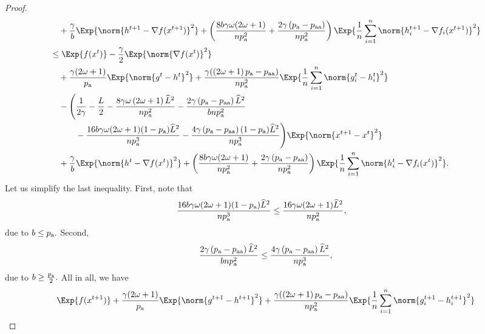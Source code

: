 \documentclass{article}
\newcommand*{\probavailable}{\ensuremath{p_{\textnormal{a}}}}
\newcommand*{\probpairaa}{\ensuremath{p_{\textnormal{aa}}}}
\begin{document}
\begin{proof}
\begin{align*}
      &\quad  + \frac{\gamma}{b} \Exp{\norm{h^{t+1} - \nabla f(x^{t+1})}^2} + \left(\frac{8 b \gamma \omega (2 \omega + 1)}{n \probavailable^2} + \frac{2 \gamma \left(\probavailable - \probpairaa\right)}{n \probavailable^2}\right) \Exp{\frac{1}{n}\sum_{i=1}^n\norm{h^{t+1}_i - \nabla f_i(x^{t+1})}^2}\\
      &\leq \Exp{f(x^t)} - \frac{\gamma}{2}\Exp{\norm{\nabla f(x^t)}^2} \\
      &\quad + \frac{\gamma (2 \omega + 1)}{\probavailable} \Exp{\norm{g^{t} - h^{t}}^2} + \frac{\gamma (\left(2 \omega + 1\right)\probavailable - \probpairaa)}{n \probavailable^2} \Exp{\frac{1}{n}\sum_{i=1}^n\norm{g^{t}_i - h^{t}_i}^2} \\
      &\quad - \Bigg(\frac{1}{2\gamma} - \frac{L}{2} - \frac{8 \gamma \omega \left(2 \omega + 1\right) \widehat{L}^2}{n \probavailable^2} - \frac{2\gamma \left(\probavailable - \probpairaa\right)\widehat{L}^2}{b n \probavailable^2} \\
      &\quad\qquad - \frac{16 b \gamma \omega (2 \omega + 1) (1 - \probavailable) \widehat{L}^2}{n \probavailable^3} - \frac{4 \gamma \left(\probavailable - \probpairaa\right) (1 - \probavailable) \widehat{L}^2}{n \probavailable^3} \Bigg) \Exp{\norm{x^{t+1} - x^t}^2} \\
      &\quad + \frac{\gamma}{b} \Exp{\norm{h^{t} - \nabla f(x^{t})}^2} + \left(\frac{8 b \gamma \omega (2 \omega + 1)}{n \probavailable^2} + \frac{2 \gamma \left(\probavailable - \probpairaa\right)}{n \probavailable^2}\right)\Exp{\frac{1}{n}\sum_{i=1}^n\norm{h^{t}_i - \nabla f_i(x^{t})}^2}.
    \end{align*}
    Let us simplify the last inequality. First, note that
    \begin{align*}
      &\frac{16 b \gamma \omega (2 \omega + 1) (1 - \probavailable) \widehat{L}^2}{n \probavailable^3} \leq \frac{16 \gamma \omega (2 \omega + 1) \widehat{L}^2}{n \probavailable^2},
    \end{align*}
    due to $b \leq \probavailable.$ Second,
    \begin{align*}
      \frac{2\gamma \left(\probavailable - \probpairaa\right)\widehat{L}^2}{b n \probavailable^2} \leq \frac{4\gamma \left(\probavailable - \probpairaa\right)\widehat{L}^2}{n \probavailable^3},
    \end{align*}
    due to $b \geq \frac{\probavailable}{2}.$ All in all, we have
    \begin{align*}
      &\Exp{f(x^{t + 1})} + \frac{\gamma (2 \omega + 1)}{\probavailable} \Exp{\norm{g^{t+1} - h^{t+1}}^2} + \frac{\gamma (\left(2 \omega + 1\right)\probavailable - \probpairaa)}{n \probavailable^2} \Exp{\frac{1}{n}\sum_{i=1}^n\norm{g^{t+1}_i - h^{t+1}_i}^2}\\

\end{align*}
\end{proof}
\end{document}
